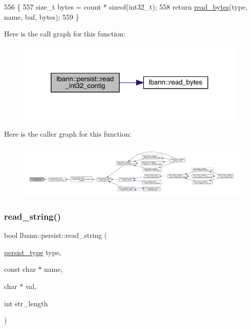 \begin{DoxyCode}
556                                                                                                       \{
557   \textcolor{keywordtype}{size\_t} bytes = count * \textcolor{keyword}{sizeof}(int32\_t);
558   \textcolor{keywordflow}{return} \hyperlink{classlbann_1_1persist_af24f635f634c8cf30cf53a0e90ec641b}{read\_bytes}(type, name, buf, bytes);
559 \}
\end{DoxyCode}
Here is the call graph for this function\+:\nopagebreak
\begin{figure}[H]
\begin{center}
\leavevmode
\includegraphics[width=313pt]{classlbann_1_1persist_a2944c32f6634223c0902b38a697a0957_cgraph}
\end{center}
\end{figure}
Here is the caller graph for this function\+:\nopagebreak
\begin{figure}[H]
\begin{center}
\leavevmode
\includegraphics[width=350pt]{classlbann_1_1persist_a2944c32f6634223c0902b38a697a0957_icgraph}
\end{center}
\end{figure}
\mbox{\label{classlbann_1_1persist_a19c0a5dbee697aff0a5a5588f2d370b9}} 
\subsubsection{\texorpdfstring{read\+\_\+string()}{read\_string()}}
{\footnotesize\ttfamily bool lbann\+::persist\+::read\+\_\+string (\begin{DoxyParamCaption}\item[{\hyperlink{namespacelbann_adee41f31f15f3906cbdcce4a1417eb56}{persist\+\_\+type}}]{type,  }\item[{const char $\ast$}]{name,  }\item[{char $\ast$}]{val,  }\item[{int}]{str\+\_\+length }\end{DoxyParamCaption})}



